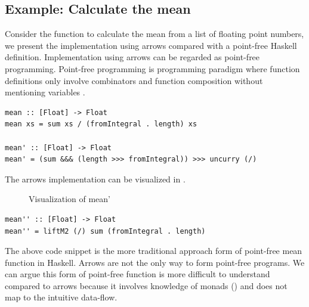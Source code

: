 \subsection{Example: Calculate the mean}
Consider the function to calculate the mean from a list of floating point numbers, we present the implementation using arrows compared with a point-free Haskell definition. Implementation using arrows can be regarded as point-free programming. Point-free programming is programming paradigm where function definitions only involve combinators and function composition without mentioning variables \cite{TacitProgramming2019}. 

\begin{verbatim}
mean :: [Float] -> Float
mean xs = sum xs / (fromIntegral . length) xs

mean' :: [Float] -> Float
mean' = (sum &&& (length >>> fromIntegral)) >>> uncurry (/)
\end{verbatim}
The arrows implementation can be visualized in .
\begin{figure}[!ht]
  \centering
  \caption{Visualization of mean'}\label{b:ar:p2}
\end{figure}
\begin{verbatim}
mean'' :: [Float] -> Float
mean'' = liftM2 (/) sum (fromIntegral . length)
\end{verbatim}
The above code snippet is the more traditional approach form of point-free mean function in Haskell. Arrows are not the only way to form point-free programs. We can argue this form of point-free function is more difficult to understand compared to arrows because it involves knowledge of monads () and does not map to the intuitive data-flow.

